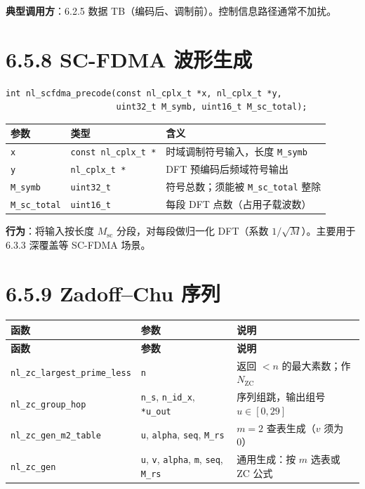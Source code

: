 \documentclass[11pt,a4paper]{ctexart}
\begin{document}
\textbf{典型调用方}：6.2.5 数据 TB（编码后、调制前）。控制信息路径通常不加扰。

\newpage
\section{6.5.8 SC-FDMA 波形生成}

\begin{lstlisting}
int nl_scfdma_precode(const nl_cplx_t *x, nl_cplx_t *y,
                      uint32_t M_symb, uint16_t M_sc_total);
\end{lstlisting}

\begin{table}[h]
\centering
\small
\begin{tabular}{lll}
\toprule
\textbf{参数} & \textbf{类型} & \textbf{含义} \\
\midrule
\texttt{x} & \texttt{const nl\_cplx\_t *} & 时域调制符号输入，长度 \texttt{M\_symb} \\
\texttt{y} & \texttt{nl\_cplx\_t *} & DFT 预编码后频域符号输出 \\
\texttt{M\_symb} & \texttt{uint32\_t} & 符号总数；须能被 \texttt{M\_sc\_total} 整除 \\
\texttt{M\_sc\_total} & \texttt{uint16\_t} & 每段 DFT 点数（占用子载波数） \\
\bottomrule
\end{tabular}
\end{table}

\textbf{行为}：将输入按长度 $M_{\mathrm{sc}}$ 分段，对每段做归一化 DFT（系数 $1/\sqrt{M}$）。主要用于 6.3.3 深覆盖等 SC-FDMA 场景。

\newpage
\section{6.5.9 Zadoff--Chu 序列}

\begin{longtable}{@{}L{4.2cm}L{5.8cm}L{4.5cm}@{}}
\toprule
\textbf{函数} & \textbf{参数} & \textbf{说明} \\
\midrule
\endfirsthead
\toprule\textbf{函数}&\textbf{参数}&\textbf{说明}\\\midrule\endhead
\texttt{nl\_zc\_largest\_prime\_less}
  & \texttt{n}
  & 返回 $<n$ 的最大素数；作 $N_{\mathrm{ZC}}$ \\
\texttt{nl\_zc\_group\_hop}
  & \texttt{n\_s}, \texttt{n\_id\_x}, \texttt{*u\_out}
  & 序列组跳，输出组号 $u\in[0,29]$ \\
\texttt{nl\_zc\_gen\_m2\_table}
  & \texttt{u}, \texttt{alpha}, \texttt{seq}, \texttt{M\_rs}
  & $m{=}2$ 查表生成（$v$ 须为 0） \\
\texttt{nl\_zc\_gen}
  & \texttt{u}, \texttt{v}, \texttt{alpha}, \texttt{m}, \texttt{seq}, \texttt{M\_rs}
  & 通用生成：按 $m$ 选表或 ZC 公式 \\
\bottomrule
\end{longtable}
\end{document}
